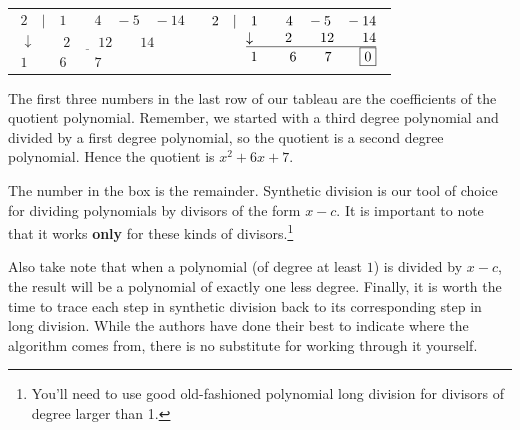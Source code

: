 \documentclass{ximera}
\begin{document}
\begin{center}
\begin{tabular}{cc}
$
\begin{array}{r}
 2 \quad |\quad 1 \quad\quad 4 \quad -5 \quad -14 \\
 \underline{\downarrow \quad\quad  2 \quad\quad 12 \quad\quad 14}\\
1\phantom{.} \quad\quad 6 \quad\quad 7 \quad\quad\quad \phantom{0}
\end{array}
$

\quad\quad\quad 
&
\quad\quad\quad

$
\begin{array}{r}
 2 \quad |\quad 1 \quad\quad 4 \quad -5 \quad -14 \\
 \underline{\downarrow \quad\quad  2 \quad\quad 12 \quad\quad 14}\\
1\phantom{.} \quad\quad 6 \quad\quad 7 \quad\quad \fbox{0}
\end{array}
$

\end{tabular}
\end{center}

The first three numbers in the last row of our tableau are the coefficients of the quotient polynomial.  Remember, we started with a third degree polynomial and divided by a first degree polynomial, so the quotient is a second degree polynomial.  Hence the quotient is $x^2+6x+7$.  

 

The number in the box is the remainder.  Synthetic division is our tool of choice for dividing polynomials by divisors of the form $x-c$.  It is important to note that it works \textbf{only} for these kinds of divisors.\footnote{You'll need to use good old-fashioned polynomial long division for divisors of degree larger than 1.} 

 

Also take note that when a polynomial (of degree at least $1$) is divided by $x-c$, the result will be a polynomial of exactly one less degree. Finally, it is  worth the time to trace each step in synthetic division back to its corresponding step in long division.  While the authors have done their best to indicate where the algorithm comes from, there is no substitute for working through it yourself.

 
\end{document}
